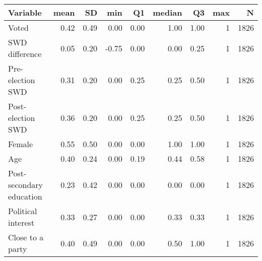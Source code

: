
\begin{tabular}{l|r|r|r|r|r|r|r|r}
\hline
Variable & mean & SD & min & Q1 & median & Q3 & max & N\\
\hline
Voted & 0.42 & 0.49 & 0.00 & 0.00 & 1.00 & 1.00 & 1 & 1826\\
\hline
SWD difference & 0.05 & 0.20 & -0.75 & 0.00 & 0.00 & 0.25 & 1 & 1826\\
\hline
Pre-election SWD & 0.31 & 0.20 & 0.00 & 0.25 & 0.25 & 0.50 & 1 & 1826\\
\hline
Post-election SWD & 0.36 & 0.20 & 0.00 & 0.25 & 0.25 & 0.50 & 1 & 1826\\
\hline
Female & 0.55 & 0.50 & 0.00 & 0.00 & 1.00 & 1.00 & 1 & 1826\\
\hline
Age & 0.40 & 0.24 & 0.00 & 0.19 & 0.44 & 0.58 & 1 & 1826\\
\hline
Post-secondary education & 0.23 & 0.42 & 0.00 & 0.00 & 0.00 & 0.00 & 1 & 1826\\
\hline
Political interest & 0.33 & 0.27 & 0.00 & 0.00 & 0.33 & 0.33 & 1 & 1826\\
\hline
Close to a party & 0.40 & 0.49 & 0.00 & 0.00 & 0.50 & 1.00 & 1 & 1826\\
\hline
\end{tabular}
